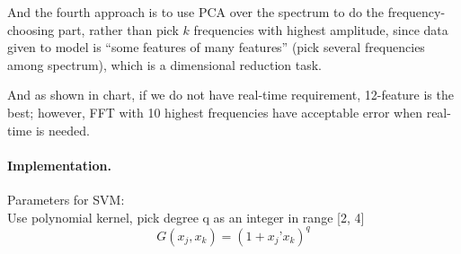 And the fourth approach is to use PCA over the spectrum to do the 
frequency-choosing part, rather than pick $k$ frequencies with 
highest amplitude, since data given to model is ``some features of 
many features'' (pick several frequencies among spectrum), which is a 
dimensional reduction task. 

And as shown in chart, if we do not have real-time requirement, 
12-feature is the best; however, FFT with 10 highest frequencies have 
acceptable error when real-time is needed. 

\paragraph{Implementation.}
Parameters for SVM: \\
Use polynomial kernel, pick degree q as an integer in range [2, 4]
\begin{equation*}
G(x_{j},x_{k}) = (1+x_{j}’ x_{k})^{q}
\end{equation*}



